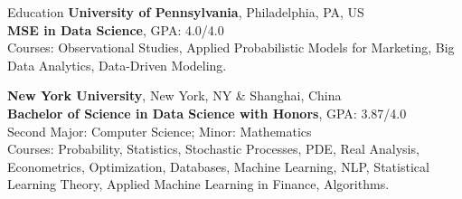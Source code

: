 \begin{rubric}{Education}
%
	\textbf{University of Pennsylvania}, Philadelphia, PA, US\\
	\textbf{MSE in Data Science}, GPA: 4.0/4.0\\
	Courses: Observational Studies, Applied Probabilistic Models for Marketing, Big Data Analytics, Data-Driven Modeling.

%
	\textbf{New York University}, New York, NY \& Shanghai, China\\
	\textbf{Bachelor of Science in Data Science with Honors}, GPA: 3.87/4.0\\
	Second Major: Computer Science; Minor: Mathematics\\
	Courses: Probability, Statistics, Stochastic Processes, PDE, Real Analysis, Econometrics, Optimization, Databases, Machine Learning, NLP, Statistical Learning Theory, Applied Machine Learning in Finance, Algorithms.
\end{rubric}
